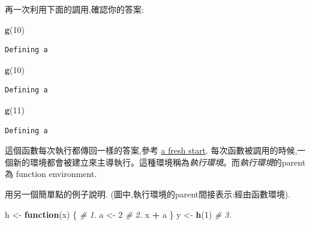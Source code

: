 \documentclass[]{book}
\newenvironment{Shaded}{\begin{snugshade}}{\end{snugshade}}
\newcommand{\KeywordTok}[1]{\textcolor[rgb]{0.13,0.29,0.53}{\textbf{#1}}}
\newcommand{\DecValTok}[1]{\textcolor[rgb]{0.00,0.00,0.81}{#1}}
\newcommand{\StringTok}[1]{\textcolor[rgb]{0.31,0.60,0.02}{#1}}
\newcommand{\CommentTok}[1]{\textcolor[rgb]{0.56,0.35,0.01}{\textit{#1}}}
\newcommand{\ControlFlowTok}[1]{\textcolor[rgb]{0.13,0.29,0.53}{\textbf{#1}}}
\newcommand{\OperatorTok}[1]{\textcolor[rgb]{0.81,0.36,0.00}{\textbf{#1}}}
\newcommand{\NormalTok}[1]{#1}
\theoremstyle{definition}
\theoremstyle{definition}
\theoremstyle{definition}
\theoremstyle{remark}
\begin{document}
再一次利用下面的調用,確認你的答案:

\begin{Shaded}
\begin{Highlighting}[]
\KeywordTok{g}\NormalTok{(}\DecValTok{10}\NormalTok{)}
\end{Highlighting}
\end{Shaded}

\begin{verbatim}
Defining a
\end{verbatim}

\begin{Shaded}
\begin{Highlighting}[]
\KeywordTok{g}\NormalTok{(}\DecValTok{10}\NormalTok{)}
\end{Highlighting}
\end{Shaded}

\begin{verbatim}
Defining a
\end{verbatim}

\begin{Shaded}
\begin{Highlighting}[]
\KeywordTok{g}\NormalTok{(}\DecValTok{11}\NormalTok{)}
\end{Highlighting}
\end{Shaded}

\begin{verbatim}
Defining a
\end{verbatim}

這個函數每次執行都傳回一樣的答案,參考 \protect\hyperlink{fresh-start}{a
fresh start}.
每次函數被調用的時候,一個新的環境都會被建立來主導執行。這種環境稱為\emph{執行環境}。而\emph{執行環境}的parent為
function environment.

用另一個簡單點的例子說明. (圖中,執行環境的parent間接表示:經由函數環境).

\begin{Shaded}
\begin{Highlighting}[]
\NormalTok{h <-}\StringTok{ }\ControlFlowTok{function}\NormalTok{(x) \{}
  \CommentTok{# 1.}
\NormalTok{  a <-}\StringTok{ }\DecValTok{2} \CommentTok{# 2.}
\NormalTok{  x }\OperatorTok{+}\StringTok{ }\NormalTok{a}
\NormalTok{\}}
\NormalTok{y <-}\StringTok{ }\KeywordTok{h}\NormalTok{(}\DecValTok{1}\NormalTok{) }\CommentTok{# 3.}
\end{Highlighting}
\end{Shaded}
\end{document}
